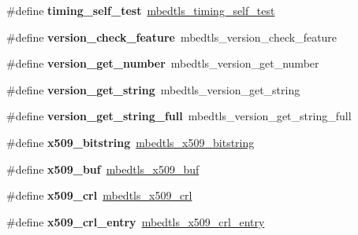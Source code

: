 \begin{DoxyCompactItemize}
\#define {\bfseries timing\+\_\+self\+\_\+test}~\mbox{\hyperlink{timing_8h_aa832a2e14723215d909150c337199f53}{mbedtls\+\_\+timing\+\_\+self\+\_\+test}}
\item 
\mbox{\label{compat-1_83_8h_a871dd9649c48464cb27bdc6c71673425}} 
\#define {\bfseries version\+\_\+check\+\_\+feature}~mbedtls\+\_\+version\+\_\+check\+\_\+feature
\item 
\mbox{\label{compat-1_83_8h_a9d998746019e4445ee3b9b4a24f80a1d}} 
\#define {\bfseries version\+\_\+get\+\_\+number}~mbedtls\+\_\+version\+\_\+get\+\_\+number
\item 
\mbox{\label{compat-1_83_8h_ad0a99004a5b9e72ee73ca83232bf7239}} 
\#define {\bfseries version\+\_\+get\+\_\+string}~mbedtls\+\_\+version\+\_\+get\+\_\+string
\item 
\mbox{\label{compat-1_83_8h_a4ade7ab628ab65cf9a7a2be00218811d}} 
\#define {\bfseries version\+\_\+get\+\_\+string\+\_\+full}~mbedtls\+\_\+version\+\_\+get\+\_\+string\+\_\+full
\item 
\mbox{\label{compat-1_83_8h_af2c7687bb5d4bc30de8aa4ad1cade751}} 
\#define {\bfseries x509\+\_\+bitstring}~\mbox{\hyperlink{group__x509__module_gaf25a97602f25027e160f22f6d5590636}{mbedtls\+\_\+x509\+\_\+bitstring}}
\item 
\mbox{\label{compat-1_83_8h_a70fe40b44e1b684215e6b7ac7d32de14}} 
\#define {\bfseries x509\+\_\+buf}~\mbox{\hyperlink{group__x509__module_ga4d02c9e8e4e2934555e0d132cd2976dc}{mbedtls\+\_\+x509\+\_\+buf}}
\item 
\mbox{\label{compat-1_83_8h_a79e8abe30480e3bd1ddfc4c366902dd3}} 
\#define {\bfseries x509\+\_\+crl}~\mbox{\hyperlink{structmbedtls__x509__crl}{mbedtls\+\_\+x509\+\_\+crl}}
\item 
\mbox{\label{compat-1_83_8h_aeb6ad40cfff7a57fe8ec4cab9367e46e}} 
\#define {\bfseries x509\+\_\+crl\+\_\+entry}~\mbox{\hyperlink{structmbedtls__x509__crl__entry}{mbedtls\+\_\+x509\+\_\+crl\+\_\+entry}}
\item 
\mbox{\label{compat-1_83_8h_a4eeeade057857f22e148c44ebf99e924}} 

\end{DoxyCompactItemize}
